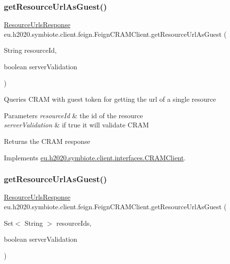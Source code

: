 \subsubsection{\texorpdfstring{get\+Resource\+Url\+As\+Guest()}{getResourceUrlAsGuest()}\hspace{0.1cm}{\footnotesize\ttfamily [1/2]}}
{\footnotesize\ttfamily \hyperlink{classeu_1_1h2020_1_1symbiote_1_1core_1_1internal_1_1cram_1_1ResourceUrlsResponse}{Resource\+Urls\+Response} eu.\+h2020.\+symbiote.\+client.\+feign.\+Feign\+C\+R\+A\+M\+Client.\+get\+Resource\+Url\+As\+Guest (\begin{DoxyParamCaption}\item[{String}]{resource\+Id,  }\item[{boolean}]{server\+Validation }\end{DoxyParamCaption})}

Queries C\+R\+AM with guest token for getting the url of a single resource


\begin{DoxyParams}{Parameters}
{\em resource\+Id} & the id of the resource \\
\hline
{\em server\+Validation} & if true it will validate C\+R\+AM \\
\hline
\end{DoxyParams}
\begin{DoxyReturn}{Returns}
the C\+R\+AM response 
\end{DoxyReturn}


Implements \hyperlink{interfaceeu_1_1h2020_1_1symbiote_1_1client_1_1interfaces_1_1CRAMClient_a97c634fa1b97dba4a989360cc26b7b8d}{eu.\+h2020.\+symbiote.\+client.\+interfaces.\+C\+R\+A\+M\+Client}.

\mbox{\label{classeu_1_1h2020_1_1symbiote_1_1client_1_1feign_1_1FeignCRAMClient_abbf69636e4cb53f646335db80c10c3ca}} 
\subsubsection{\texorpdfstring{get\+Resource\+Url\+As\+Guest()}{getResourceUrlAsGuest()}\hspace{0.1cm}{\footnotesize\ttfamily [2/2]}}
{\footnotesize\ttfamily \hyperlink{classeu_1_1h2020_1_1symbiote_1_1core_1_1internal_1_1cram_1_1ResourceUrlsResponse}{Resource\+Urls\+Response} eu.\+h2020.\+symbiote.\+client.\+feign.\+Feign\+C\+R\+A\+M\+Client.\+get\+Resource\+Url\+As\+Guest (\begin{DoxyParamCaption}\item[{Set$<$ String $>$}]{resource\+Ids,  }\item[{boolean}]{server\+Validation }\end{DoxyParamCaption})}

